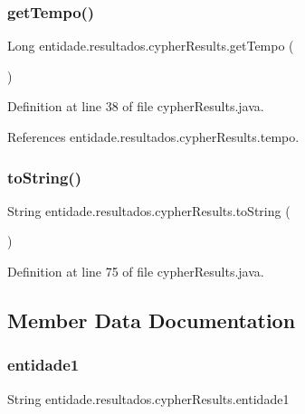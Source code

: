\subsubsection{\texorpdfstring{get\+Tempo()}{getTempo()}}
{\footnotesize\ttfamily Long entidade.\+resultados.\+cypher\+Results.\+get\+Tempo (\begin{DoxyParamCaption}{ }\end{DoxyParamCaption})}



Definition at line 38 of file cypher\+Results.\+java.



References entidade.\+resultados.\+cypher\+Results.\+tempo.

\hypertarget{classentidade_1_1resultados_1_1cypherResults_abd2c774d19f2378d5e6e635ce155224b}{}\label{classentidade_1_1resultados_1_1cypherResults_abd2c774d19f2378d5e6e635ce155224b} 
\subsubsection{\texorpdfstring{to\+String()}{toString()}}
{\footnotesize\ttfamily String entidade.\+resultados.\+cypher\+Results.\+to\+String (\begin{DoxyParamCaption}{ }\end{DoxyParamCaption})}



Definition at line 75 of file cypher\+Results.\+java.



\subsection{Member Data Documentation}
\hypertarget{classentidade_1_1resultados_1_1cypherResults_a9baf0ede3f9f4ee7aa7c6863033b9e5c}{}\label{classentidade_1_1resultados_1_1cypherResults_a9baf0ede3f9f4ee7aa7c6863033b9e5c} 
\subsubsection{\texorpdfstring{entidade1}{entidade1}}
{\footnotesize\ttfamily String entidade.\+resultados.\+cypher\+Results.\+entidade1\hspace{0.3cm}{\ttfamily [private]}}




